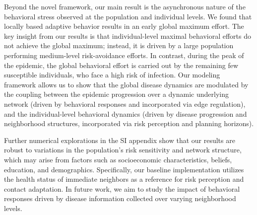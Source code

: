 \documentclass[9pt,twocolumn,twoside]{pnas-new}
\begin{document}
Beyond the novel framework, our main result is the asynchronous nature of the behavioral stress observed at the population and individual levels. We found that locally based adaptive behavior results in an early global maximum effort.
The key insight from our results is that individual-level maximal behavioral efforts do not achieve the global maximum; instead, it is driven by a large population performing medium-level risk-avoidance efforts.
In contrast, during the peak of the epidemic, the global behavioral effort is carried out by the remaining few susceptible individuals, who face a high risk of infection.
Our modeling framework allows us to show that the global disease dynamics are modulated by the coupling between the epidemic progression over a dynamic underlying network (driven by behavioral responses and incorporated via edge regulation), and the individual-level behavioral dynamics (driven by disease progression and neighborhood structures, incorporated via risk perception and planning horizons).
%

Further numerical explorations in the SI appendix
%
show that our results are robust to variations in the population's risk sensitivity and network structure, which may arise from factors such as socioeconomic characteristics, beliefs, education, and demographics.
Specifically, our baseline implementation utilizes the health status of immediate neighbors as a reference for risk perception and contact adaptation. In future work, we aim to study the impact of behavioral responses driven by disease information collected over varying neighborhood levels.
\end{document}
